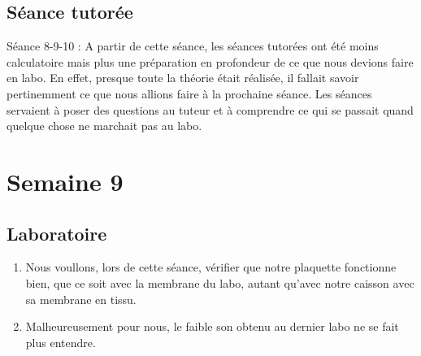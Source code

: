 \documentclass{article}
\begin{document}
\subsection{Séance tutorée}
Séance 8-9-10 : A partir de cette séance, les séances tutorées ont été moins calculatoire mais plus une préparation en profondeur de ce que nous devions faire en labo.  En effet, presque toute la théorie était réalisée, il fallait savoir pertinemment ce que nous allions faire à la prochaine séance.   Les séances servaient à poser des questions au tuteur et à comprendre ce qui se passait quand quelque chose ne marchait pas au labo.

\section{Semaine 9}
\subsection{Laboratoire}
\begin{enumerate}
	\item Nous voullons, lors de cette séance, vérifier que notre plaquette fonctionne bien, que ce soit avec la membrane du labo, 
				autant qu'avec notre caisson avec sa membrane en tissu. 
	\item Malheureusement pour nous, le faible son obtenu au dernier labo ne se fait plus entendre.
\end{enumerate}
\end{document}
